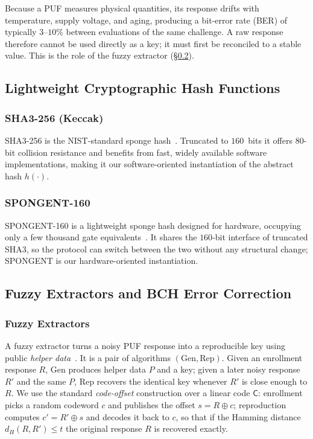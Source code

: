 \documentclass[11pt,a4paper]{article}
\begin{document}
Because a PUF measures physical quantities, its response drifts with
temperature, supply voltage, and aging, producing a bit-error rate (BER) of
typically $3$--$10\%$ between evaluations of the same challenge. A raw response
therefore cannot be used directly as a key; it must first be reconciled to a
stable value. This is the role of the fuzzy extractor
(\S\ref{subsec:bch}).

\subsection{Lightweight Cryptographic Hash Functions}

\subsubsection{SHA3-256 (Keccak)}
SHA3-256 is the NIST-standard sponge hash~\cite{sha3_standard,keccak_team}.
Truncated to $160$~bits it offers $80$-bit collision resistance and benefits
from fast, widely available software implementations, making it our
software-oriented instantiation of the abstract hash $h(\cdot)$.

\subsubsection{SPONGENT-160}
SPONGENT-160 is a lightweight sponge hash designed for hardware, occupying only
a few thousand gate equivalents~\cite{spongent_original}. It shares the
$160$-bit interface of truncated SHA3, so the protocol can switch between the
two without any structural change; SPONGENT is our hardware-oriented
instantiation.

\subsection{Fuzzy Extractors and BCH Error Correction}
\label{subsec:bch}

\subsubsection{Fuzzy Extractors}

A fuzzy extractor turns a noisy PUF response into a reproducible key using
public \emph{helper data}~\cite{bch_puf_extraction}. It is a pair of algorithms
$(\mathrm{Gen},\mathrm{Rep})$. Given an enrollment response $R$, $\mathrm{Gen}$
produces helper data $P$ and a key; given a later noisy response $R'$ and the
same $P$, $\mathrm{Rep}$ recovers the identical key whenever $R'$ is close
enough to $R$. We use the standard \emph{code-offset} construction over a
linear code $\mathsf{C}$: enrollment picks a random codeword $c$ and publishes
the offset $s = R \oplus c$; reproduction computes $c' = R' \oplus s$ and
decodes it back to $c$, so that if the Hamming distance $d_H(R,R') \le t$ the
original response $R$ is recovered exactly.
\end{document}
